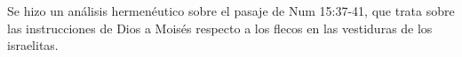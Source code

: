 Se hizo un análisis hermenéutico sobre el pasaje de Num 15:37-41, que trata sobre las instrucciones de Dios a Moisés respecto a los flecos en las vestiduras de los israelitas.